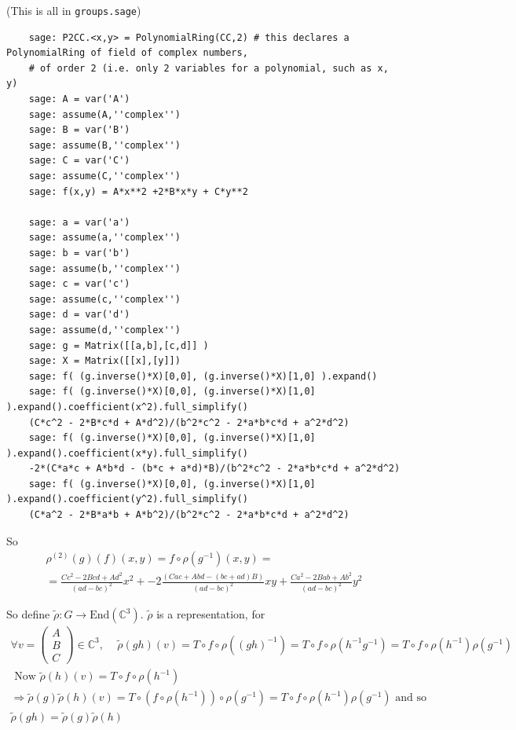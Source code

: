 \documentclass[10pt]{amsart}
\begin{document}
\begin{multicols*}{2}
\begin{enumerate}
	(This is all in \verb|groups.sage|)
	\begin{lstlisting}
	sage: P2CC.<x,y> = PolynomialRing(CC,2) # this declares a PolynomialRing of field of complex numbers, 
	# of order 2 (i.e. only 2 variables for a polynomial, such as x, y)
	sage: A = var('A')
	sage: assume(A,''complex'')
	sage: B = var('B')
	sage: assume(B,''complex'')
	sage: C = var('C')
	sage: assume(C,''complex'')
	sage: f(x,y) = A*x**2 +2*B*x*y + C*y**2
	
	sage: a = var('a')
	sage: assume(a,''complex'')
	sage: b = var('b')
	sage: assume(b,''complex'')
	sage: c = var('c')
	sage: assume(c,''complex'')
	sage: d = var('d')
	sage: assume(d,''complex'')
	sage: g = Matrix([[a,b],[c,d]] )
	sage: X = Matrix([[x],[y]])
	sage: f( (g.inverse()*X)[0,0], (g.inverse()*X)[1,0] ).expand()
	sage: f( (g.inverse()*X)[0,0], (g.inverse()*X)[1,0] ).expand().coefficient(x^2).full_simplify()
	(C*c^2 - 2*B*c*d + A*d^2)/(b^2*c^2 - 2*a*b*c*d + a^2*d^2)
	sage: f( (g.inverse()*X)[0,0], (g.inverse()*X)[1,0] ).expand().coefficient(x*y).full_simplify()
	-2*(C*a*c + A*b*d - (b*c + a*d)*B)/(b^2*c^2 - 2*a*b*c*d + a^2*d^2)
	sage: f( (g.inverse()*X)[0,0], (g.inverse()*X)[1,0] ).expand().coefficient(y^2).full_simplify()
	(C*a^2 - 2*B*a*b + A*b^2)/(b^2*c^2 - 2*a*b*c*d + a^2*d^2)
	\end{lstlisting}
	
	So 
	\[
	\begin{gathered}
	\rho^{(2)}(g)(f)(x,y) = f\circ \rho(g^{-1})(x,y) = \\
	= \frac{ Cc^2 - 2Bcd + Ad^2}{(ad-bc)^2}x^2 + - 2 \frac{ (Cac + Abd - (bc+ad) B)}{(ad-bc)^2} xy + \frac{ Ca^2 - 2Bab + Ab^2 }{(ad-bc)^2 } y^2
	\end{gathered}
	\]
	
	So define $\widetilde{ \rho}: G \to \text{End}(\mathbb{C}^3)$. $\widetilde{\rho}$ is a representation, for 
	\[
	\begin{gathered}
	\forall v = \left( \begin{matrix} A \\ B \\ C \end{matrix} \right) \in \mathbb{C}^3, \quad \, \widetilde{\rho}(gh)(v) = T \circ f \circ \rho((gh)^{-1}) = T\circ f \circ \rho(h^{-1}g^{-1}) = T\circ f \circ \rho(h^{-1}) \rho(g^{-1}) \\ 
	\text{ Now } \widetilde{\rho}(h)(v) = T\circ f \circ \rho(h^{-1}) \\
	\Longrightarrow \widetilde{\rho}(g) \widetilde{\rho}(h)(v) = T \circ (f\circ \rho(h^{-1}))\circ \rho(g^{-1}) = T\circ f \circ \rho(h^{-1}) \rho(g^{-1}) \text{ and so }\\
	\widetilde{\rho}(gh) = \widetilde{\rho}(g) \widetilde{\rho}(h)
	\end{gathered}
	\]
	

\end{enumerate}
\end{multicols*}
\end{document}
